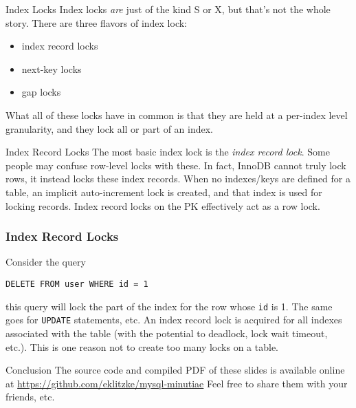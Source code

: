 \documentclass[14pt]{beamer}
\begin{document}
\begin{frame}{Index Locks}
  Index locks \emph{are} just of the kind S or X, but that's not the whole
  story. There are three flavors of index lock:
  \begin{itemize}
    \item index record locks
    \item next-key locks
    \item gap locks
  \end{itemize}
  What all of these locks have in common is that they are held at a per-index
  level granularity, and they lock all or part of an index.
\end{frame}

\begin{frame}{Index Record Locks}
  The most basic index lock is the \emph{index record lock}. Some people may
  confuse row-level locks with these. In fact, InnoDB cannot truly lock rows, it
  instead locks these index records.
  \newline
  \newline
  When no indexes/keys are defined for a table, an implicit auto-increment lock
  is created, and that index is used for locking records. Index record locks on
  the PK effectively act as a row lock.
\end{frame}

\begin{frame}[fragile]
  \frametitle{Index Record Locks}
  Consider the query
\begin{verbatim}
DELETE FROM user WHERE id = 1
\end{verbatim}
  this query will lock the part of the index for the row whose \texttt{id} is
  1. The same goes for \texttt{UPDATE} statements, etc.
  \newline
  \newline
  An index record lock is acquired for all indexes associated with the table
  (with the potential to deadlock, lock wait timeout, etc.). This is one reason
  not to create too many locks on a table.
\end{frame}

\begin{frame}{Conclusion}
  The source code and compiled PDF of these slides is available online at
  \newline
  \url{https://github.com/eklitzke/mysql-minutiae}
  \newline
  \newline
  Feel free to share them with your friends, etc.
\end{frame}
\end{document}
